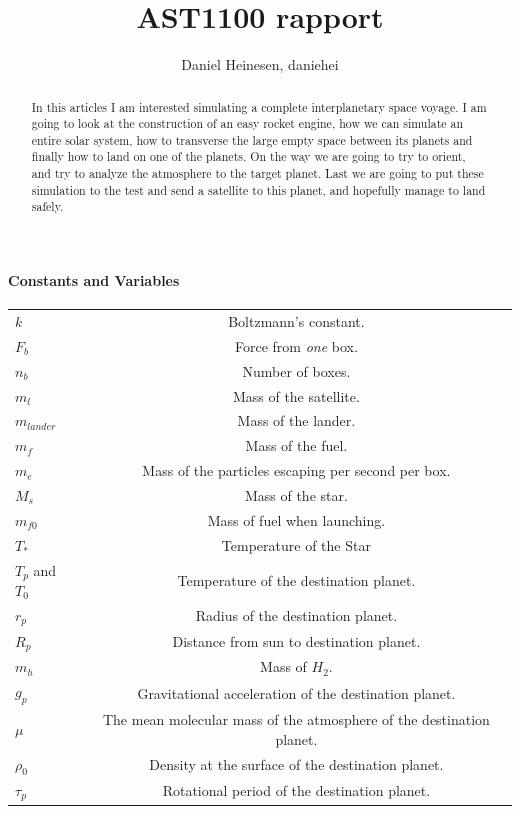 \documentclass[a4paper, 10pt]{article}
\title{AST1100 rapport}
\author{Daniel Heinesen, daniehei}
\begin{document}
\maketitle

\begin{abstract}
In this articles I am interested simulating a complete interplanetary space voyage. I am going to look at the construction of an easy rocket engine, how we can simulate an entire solar system, how to transverse the large empty space between its planets and finally how to land on one of the planets. On the way we are going to try to orient, and try to analyze the atmosphere to the target planet. Last we are going to put these simulation to the test and send a satellite to this planet, and hopefully manage to land safely.
\end{abstract} 

\paragraph*{Constants and Variables}

\begin{center}
\begin{tabular}{l  c}
$k$ & Boltzmann's constant.\\
$F_b$ & Force from \textit{one} box. \\
$n_b$ & Number of boxes.\\
$m_l$ & Mass of the satellite. \\
$m_{lander}$ & Mass of the lander.\\
$m_f$ & Mass of the fuel.\\
$m_e$ & Mass of the particles escaping per second per box. \\
$M_s$ & Mass of the star.\\
$m_{f0}$ & Mass of fuel when launching. \\
$T_*$ & Temperature of the Star\\
$T_p$ and $T_0$ & Temperature of the destination planet. \\
$r_p$ & Radius of the destination planet. \\
$R_p$ & Distance from sun to destination planet. \\
$m_h$ & Mass of $H_2$.\\
$g_p$ & Gravitational acceleration of the destination planet. \\
$\mu$ & The mean molecular mass of the atmosphere of the destination planet.\\
$\rho_0$ & Density at the surface of the destination planet. \\
$\tau_p$ & Rotational period of the destination planet. \\
\end{tabular}
\end{center}
\end{document}
